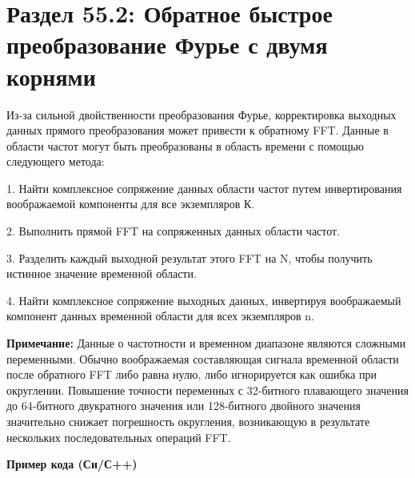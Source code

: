 

\section*{Раздел 55.2: Обратное быстрое преобразование Фурье с \newline двумя корнями}
Из-за сильной двойственности преобразования Фурье, корректировка выходных данных прямого преобразования может привести к обратному FFT. Данные в области частот могут быть преобразованы в область времени с помощью следующего метода:

\vspace{\baselineskip}
\hspace*{6mm}1.	Найти комплексное сопряжение данных области частот путем инвертирования \newline \hspace*{6mm}воображаемой компоненты для все экземпляров К.

\vspace{\baselineskip}
\hspace*{6mm}2.	Выполнить прямой FFT на сопряженных данных области частот.

\vspace{\baselineskip}
\hspace*{6mm}3.	Разделить каждый выходной результат этого FFT на N, чтобы получить истинное \newline \hspace*{6mm}значение временной области.

\vspace{\baselineskip}
\hspace{6mm}4.	Найти комплексное сопряжение выходных данных, инвертируя воображаемый компонент \newline \hspace*{6mm}данных временной области для всех экземпляров n.

\vspace{\baselineskip}
\textbf{Примечание:} Данные о частотности и временном диапазоне являются сложными переменными. Обычно воображаемая составляющая сигнала временной области после обратного FFT либо равна нулю, либо игнорируется как ошибка при округлении. Повышение точности переменных с 32-битного плавающего значения до 64-битного двукратного значения или 128-битного двойного значения значительно снижает погрешность округления, возникающую в результате нескольких последовательных операций FFT.

\vspace{\baselineskip}
\textbf{Пример кода (Си/С++)}

